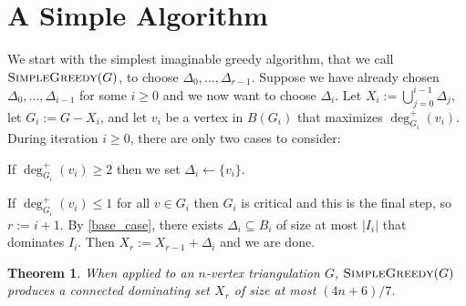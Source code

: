 \documentclass[12pt]{article}
\newtheorem{thm}{Theorem}
\begin{document}
\section{A Simple Algorithm}




We start with the simplest imaginable greedy algorithm, that we call $\textsc{SimpleGreedy}(G)$, to choose $\Delta_0,\ldots,\Delta_{r-1}$.  Suppose we have already chosen $\Delta_0,\ldots,\Delta_{i-1}$ for some $i\ge 0$ and we now want to choose $\Delta_i$.  Let $X_i:=\bigcup_{j=0}^{i-1}\Delta_j$, let $G_i:=G-X_i$, and let $v_i$ be a vertex in $B(G_i)$ that maximizes $\deg^+_{G_i}(v_i)$.  During iteration $i\ge 0$, there are only two cases to consider:  
\begin{compactenum}
    \item If $\deg^+_{G_i}(v_i)\ge 2$ then we set $\Delta_i\gets\{v_i\}$.
    \item If $\deg^+_{G_i}(v_i)\le 1$ for all $v\in G_i$ then $G_i$ is critical and this is the final step, so $r:=i+1$.  By \cref{base_case}, there exists $\Delta_i\subseteq B_i$ of size at most $|I_i|$ that dominates $I_i$. Then $X_r:=X_{r-1}+\Delta_{i}$ and we are done.
\end{compactenum}

\begin{thm}\label{simple_greedy}
  When applied to an $n$-vertex triangulation $G$,  $\textsc{SimpleGreedy}(G)$ produces a connected dominating set $X_r$ of size at most $(4n+6)/7$.
\end{thm}
\end{document}
